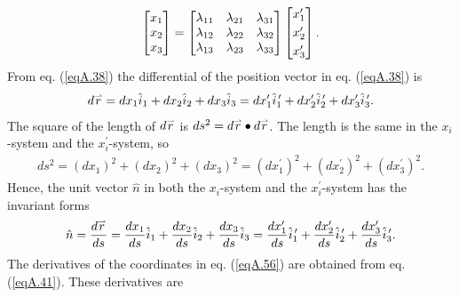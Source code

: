 \documentclass{AeroStructure-ERJohnson}
\def\harp#1{\smash{\mathord{\buildrel{\lower3pt\hbox{$\scriptscriptstyle\rightharpoonup$}}\over{#1}}}}
\begin{document}
\begin{align}\label{eqA.53}
\left[\begin{array}{@{}l@{}}x_{1} \\x_{2} \\x_{3}\end{array}\right]=\left[\begin{array}{@{}lll@{}}\lambda_{11} & \lambda_{21} & \lambda_{31} \\\lambda_{12} & \lambda_{22} & \lambda_{32} \\\lambda_{13} & \lambda_{23} & \lambda_{33}\end{array}\right]\left[\begin{array}{@{}l@{}}x_{1}^{\prime} \\[3pt] x_{2}^{\prime} \\[3pt] x_{3}^{\prime}\end{array}\right].
\end{align}
\indent From eq. (\ref{eqA.38}) the differential of the position vector in eq. (\ref{eqA.38}) is
\begin{align}\label{eqA.54}
d \harp{r}=d x_{1} \hat{i}_{1}+d x_{2} \hat{i}_{2}+d x_{3} \hat{i}_{3}=d x_{1}^{\prime} \hat{i}_{1}^{\,\prime}+d x_{2}^{\prime} \hat{i}_{2}^{\,\prime}+d x_{3}^{\prime} \hat{i}_{3}^{\,\prime}.
\end{align}
The square of the length of $d \harp{r}$ is $d s^{2}=d \harp{r} \bullet d \harp{r}$. The length is the same in the $x_{i}$-system and the $x_{i}^{\prime}$-system, so
\begin{align}\label{eqA.55}
d s^{2}=(d x_{1})^{2}+(d x_{2})^{2}+(d x_{3})^{2}=(d x_{1}^{\prime})^{2}+(d x_{2}^{\prime})^{2}+(d x_{3}^{\prime})^{2}.
\end{align}
Hence, the unit vector $\hat{n}$ in both the $x_{i}$-system and the $x_{i}^{\prime}$-system has the invariant forms
\begin{align}\label{eqA.56}
\hat{n}=\frac{d \harp{r}}{d s}=\frac{d x_{1}}{d s} \hat{i}_{1}+\frac{d x_{2}}{d s} \hat{i}_{2}+\frac{d x_{3}}{d s} \hat{i}_{3}=\frac{d x_{1}^{\prime}}{d s} \hat{i}_{1}^{\,\prime}+\frac{d x_{2}^{\prime}}{d s} \hat{i}_{2}^{\,\prime}+\frac{d x_{3}^{\prime}}{d s} \hat{i}_{3}^{\,\prime}.
\end{align}
The derivatives of the coordinates in eq. (\ref{eqA.56}) are obtained from eq. (\ref{eqA.41}). These derivatives are
\end{document}
